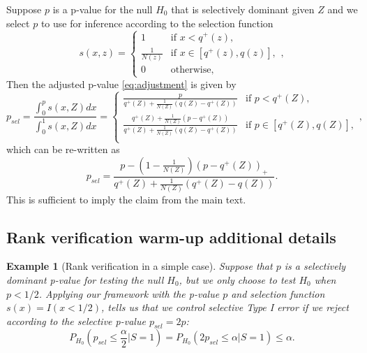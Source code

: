 \documentclass{article}
\newtheorem{example}{Example}
\begin{document}
\begin{appendix}
Suppose $p$ is a p-value for the null $H_0$ that is selectively dominant given $Z$ and we select $p$ to use for inference according to the selection function 
    \begin{equation*}
        s(x, z) = 
        \begin{cases} 
        1 & \text{if } x < q^+(z), \\
        \frac{1}{N(z)} & \text{if } x \in [q^+(z), q(z)], \\
        0 & \text{otherwise},
        \end{cases},
    \end{equation*}
Then the adjusted p-value \eqref{eq:adjustment} is given by 
\begin{equation*}
    p_{sel} = \frac{\int_0^p s(x, Z) dx }{\int_0^1 s(x, Z)dx} = 
        \begin{cases} 
        \frac{p}{q^{+}(Z) + \frac{1}{N(Z)}(q(Z) - q^{+}(Z)) }  & \text{if } p  < q^+(Z), \\
        \frac{q^{+}(Z)+ \frac{1}{N(Z)}(p - q^{+}(Z))}{q^{+}(Z) + \frac{1}{N(Z)}(q(Z) - q^{+}(Z)) } & \text{if } p \in [q^+(Z), q(Z)], \\
        \end{cases},
\end{equation*}
which can be re-written as 
\begin{equation*}
   p_{sel} = \frac{p - (1-\frac{1}{N(Z)})(p - q^+(Z))_+ }{q^+(Z) + \frac{1}{N(Z)}(q^+(Z) - q(Z))}.
\end{equation*}
This is sufficient to imply the claim from the main text. 


\subsection{Rank verification warm-up additional details}
\label{sec:rank_verification_warm_up_appdx}

\begin{example}[Rank verification in a simple case]
    \label{exm:rank_verification}
    Suppose that $p$ is a selectively dominant p-value for testing the null $H_0$, but we only choose to test $H_0$ when $p < 1/2$. Applying our framework with the p-value $p$ and selection function $s(x) = I(x < 1/2)$,  tells us that we control selective Type I error if we reject according to the selective p-value $p_{sel} = 2p$:
    \begin{equation}
        \label{eq:rank_verification_error_control}
        P_{H_{0}}\left(p_{sel} \leq \frac{\alpha}{2} | S = 1\right) = P_{H_{0}}\left(2p_{sel} \leq \alpha | S = 1\right) \leq \alpha.
    \end{equation} 
    

\end{example}
\end{appendix}
\end{document}
